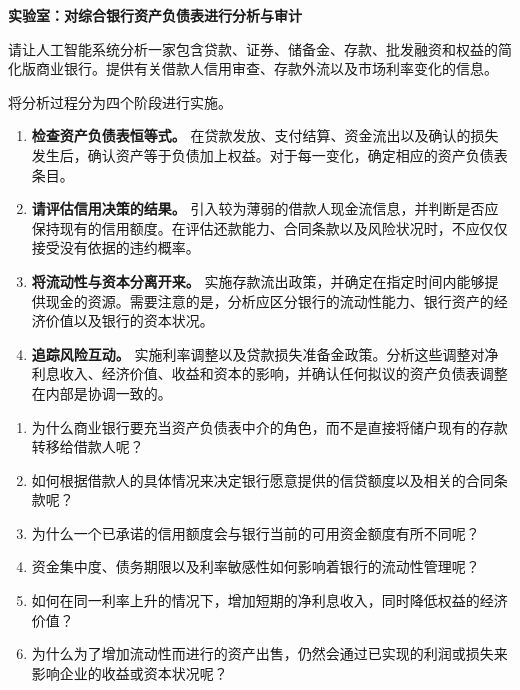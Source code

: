

\textbf{实验室：对综合银行资产负债表进行分析与审计}

请让人工智能系统分析一家包含贷款、证券、储备金、存款、批发融资和权益的简化版商业银行。提供有关借款人信用审查、存款外流以及市场利率变化的信息。

将分析过程分为四个阶段进行实施。

\begin{enumerate}

\item \textbf{检查资产负债表恒等式。} 在贷款发放、支付结算、资金流出以及确认的损失发生后，确认资产等于负债加上权益。对于每一变化，确定相应的资产负债表条目。

\item \textbf{请评估信用决策的结果。}  
引入较为薄弱的借款人现金流信息，并判断是否应保持现有的信用额度。在评估还款能力、合同条款以及风险状况时，不应仅仅接受没有依据的违约概率。

\item \textbf{将流动性与资本分离开来。}  
实施存款流出政策，并确定在指定时间内能够提供现金的资源。需要注意的是，分析应区分银行的流动性能力、银行资产的经济价值以及银行的资本状况。

\item \textbf{追踪风险互动。}  
实施利率调整以及贷款损失准备金政策。分析这些调整对净利息收入、经济价值、收益和资本的影响，并确认任何拟议的资产负债表调整在内部是协调一致的。

\end{enumerate}



\begin{enumerate}

\item 为什么商业银行要充当资产负债表中介的角色，而不是直接将储户现有的存款转移给借款人呢？

\item 如何根据借款人的具体情况来决定银行愿意提供的信贷额度以及相关的合同条款呢？

\item 为什么一个已承诺的信用额度会与银行当前的可用资金额度有所不同呢？

\item 资金集中度、债务期限以及利率敏感性如何影响着银行的流动性管理呢？

\item 如何在同一利率上升的情况下，增加短期的净利息收入，同时降低权益的经济价值？

\item 为什么为了增加流动性而进行的资产出售，仍然会通过已实现的利润或损失来影响企业的收益或资本状况呢？

\end{enumerate}

